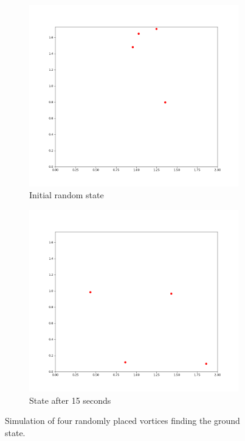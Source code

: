 \documentclass{article}
\numberwithin{equation}{section}
\begin{document}
\begin{figure}[htb]
\centering
\begin{subfigure}[t]{.49\textwidth}
    \centering
    \includegraphics[width=.9\linewidth]{results/gifs/ground_state_rand_000.png}
    \caption{Initial random state}
    \label{fig:ground_rand_000}
\end{subfigure}
\hfill
\begin{subfigure}[t]{.49\textwidth}
    \centering
\includegraphics[width=.9\linewidth]{results/gifs/ground_state_rand_749.png}
    \caption{State after 15 seconds}
    \label{fig:ground_rand_749}
\end{subfigure}
\caption{Simulation of four randomly placed vortices finding the ground state.}
\label{fig:ground_rand}
\end{figure}
\end{document}
